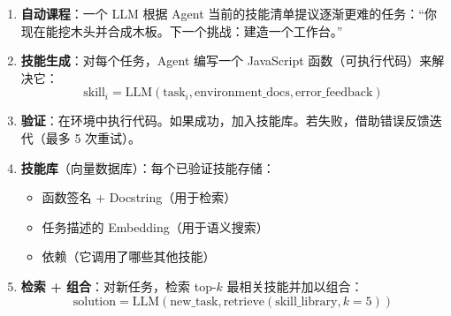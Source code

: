 \begin{enumerate}
  \item \textbf{自动课程}：一个 LLM 根据 Agent 当前的技能清单提议逐渐更难的任务：``你现在能挖木头并合成木板。下一个挑战：建造一个工作台。''
  \item \textbf{技能生成}：对每个任务，Agent 编写一个 JavaScript 函数（可执行代码）来解决它：
\begin{equation}
\text{skill}_i = \text{LLM}(\text{task}_i, \text{environment\_docs}, \text{error\_feedback})
\end{equation}
  \item \textbf{验证}：在环境中执行代码。如果成功，加入技能库。若失败，借助错误反馈迭代（最多 5 次重试）。
  \item \textbf{技能库}（向量数据库）：每个已验证技能存储：

\begin{itemize}
  \item 函数签名 + Docstring（用于检索）
  \item 任务描述的 Embedding（用于语义搜索）
  \item 依赖（它调用了哪些其他技能）
\end{itemize}
  \item \textbf{检索 + 组合}：对新任务，检索 top-$k$ 最相关技能并加以组合：
\begin{equation}
\text{solution} = \text{LLM}(\text{new\_task}, \text{retrieve}(\text{skill\_library}, k{=}5))
\end{equation}
\end{enumerate}

